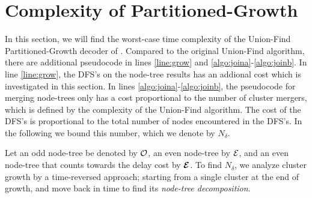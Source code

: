 
\section{Complexity of Partitioned-Growth}\label{sec:complexity}

In this section, we will find the worst-case time complexity of the Union-Find Partitioned-Growth decoder of . Compared to the original Union-Find algorithm, there are additional pseudocode in lines \ref{line:grow} and \ref{algo:joina}-\ref{algo:joinb}. In line \ref{line:grow}, the DFS's on the node-tree results has an addional cost which is investigated in this section. In lines \ref{algo:joina}-\ref{algo:joinb}, the pseudocode for merging node-trees only has a cost proportional to the number of cluster mergers, which is defined by the complexity of the Union-Find algorithm. 
The cost of the DFS's is proportional to the total number of nodes encountered in the DFS's. In the following we bound this number, which we denote by $N_\delta$. 

Let an odd node-tree be denoted by $\mathcal{O}$, an even node-tree by $\mathcal{E}$, and an even node-tree that counts towards the delay cost by $\bm{\mathcal{E}}$. To find $N_\delta$, we analyze cluster growth by a time-reversed approach; starting from a single cluster at the end of growth, and move back in time to find its \emph{node-tree decomposition}.


